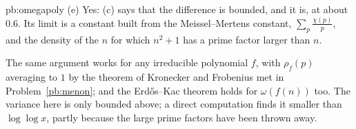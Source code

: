 \begin{solution}{pb:omegapoly}
(e) Yes: (c) says that the difference is bounded, and it is, at about $0.6$. Its limit is a constant built from the Meissel--Mertens constant, $\sum_p\frac{\chi(p)}p$, and the
density of the $n$ for which $n^2+1$ has a prime factor larger than $n$.

\leads The same argument works for any irreducible polynomial $f$, with $\rho_f(p)$ averaging to $1$ by the theorem of Kronecker and Frobenius met in Problem~\ref{pb:menon}; and the
Erd\H os--Kac theorem holds for $\omega(f(n))$ too. The variance here is only bounded above; a direct computation finds it smaller than $\log\log x$, partly because the large prime factors
have been thrown away.
\end{solution}

